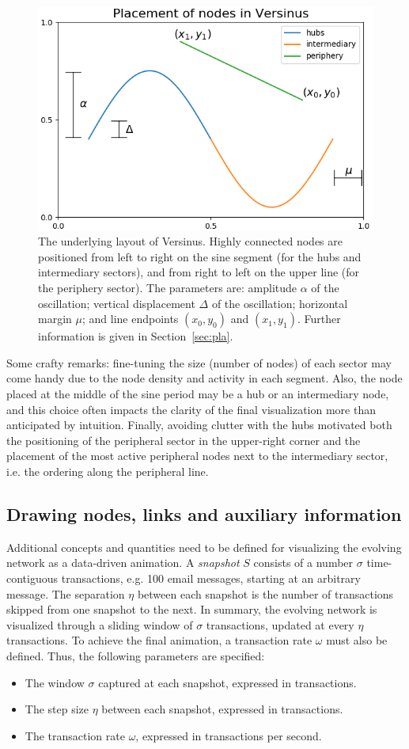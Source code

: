 \documentclass[runningheads]{llncs}
\begin{document}
\begin{figure}[!h]\centering
\includegraphics[width=.7\textwidth]{nodePositioning}
  \caption{The underlying layout of Versinus. Highly connected nodes are positioned from left to right on the sine segment (for the hubs and intermediary sectors), and from right to left on the upper line (for the periphery sector). The parameters are: amplitude $\alpha$ of the oscillation; vertical displacement $\Delta$ of the oscillation; horizontal margin $\mu$; and line endpoints $(x_0, y_0)$ and $(x_1, y_1)$.
   Further information is given in Section~\ref{sec:pla}.
  }\label{fig:glob}
\end{figure}

\noindent Some crafty remarks: fine-tuning the size (number of nodes) of each sector may come handy due to the node density and activity in each segment. Also, the node placed at the middle of the sine period may be a hub or an intermediary node, and this choice often impacts the clarity of the final visualization more than anticipated by intuition.
Finally, avoiding clutter with the hubs motivated both 
the positioning of the peripheral sector in the upper-right corner and
the placement of the most active peripheral nodes next to the intermediary sector, i.e. the ordering along the peripheral line.

\subsection{Drawing nodes, links and auxiliary information}
Additional concepts and quantities need to be defined for visualizing the evolving network as a data-driven animation.
A \emph{snapshot} $S$ consists of a number $\sigma$ time-contiguous transactions, e.g. 100 email messages, starting at an arbitrary message.
The separation $\eta$ between each snapshot is the number of transactions skipped from one snapshot to the next.
In summary, the evolving network is visualized through a sliding window of $\sigma$ transactions, updated at every $\eta$ transactions. To achieve the final animation, a transaction rate $\omega$ must also be defined.
Thus, the following parameters are specified:
\begin{itemize}
  \item The window $\sigma$ captured at each snapshot, expressed in transactions.
  \item The step size $\eta$ between each snapshot, expressed in transactions.
  \item The transaction rate $\omega$, expressed in transactions per second.
\end{itemize}
\end{document}
